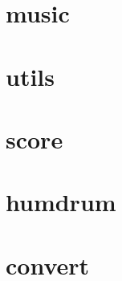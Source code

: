 \documentclass[10pt]{article}
\begin{document}
\section{music}

\newpage
\section{utils}

\newpage
\section{score}

\newpage
\section{humdrum}

\newpage
\section{convert}

\end{document}
